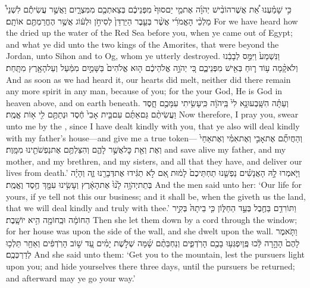 {כִּ֣י שָׁמַ֗עְנוּ אֵ֠ת אֲשֶׁר\maqqaf הוֹבִ֨ישׁ יְהֹוָ֜ה אֶת\maqqaf מֵ֤י יַם\maqqaf סוּף֙ מִפְּנֵיכֶ֔ם בְּצֵאתְכֶ֖ם מִמִּצְרָ֑יִם וַאֲשֶׁ֣ר עֲשִׂיתֶ֡ם לִשְׁנֵי֩ מַלְכֵ֨י הָאֱמֹרִ֜י אֲשֶׁ֨ר בְּעֵ֤בֶר הַיַּרְדֵּן֙ לְסִיחֹ֣ן וּלְע֔וֹג אֲשֶׁ֥ר הֶחֱרַמְתֶּ֖ם אוֹתָֽם׃}
{For we have heard how the \lord\space dried up the water of the Red Sea before you, when ye came out of Egypt; and what ye did unto the two kings of the Amorites, that were beyond the Jordan, unto Sihon and to Og, whom ye utterly destroyed.}
{וַנִּשְׁמַע֙ וַיִּמַּ֣ס לְבָבֵ֔נוּ וְלֹא\maqqaf קָ֨מָה ע֥וֹד ר֛וּחַ בְּאִ֖ישׁ מִפְּנֵיכֶ֑ם כִּ֚י יְהֹוָ֣ה אֱלֹהֵיכֶ֔ם ה֤וּא אֱלֹהִים֙ בַּשָּׁמַ֣יִם מִמַּ֔עַל וְעַל\maqqaf הָאָ֖רֶץ מִתָּֽחַת׃}
{And as soon as we had heard it, our hearts did melt, neither did there remain any more spirit in any man, because of you; for the \lord\space your God, He is God in heaven above, and on earth beneath.}
{וְעַתָּ֗ה הִשָּֽׁבְעוּ\maqqaf נָ֥א לִי֙ בַּֽיהֹוָ֔ה כִּֽי\maqqaf עָשִׂ֥יתִי עִמָּכֶ֖ם חָ֑סֶד וַעֲשִׂיתֶ֨ם גַּם\maqqaf אַתֶּ֜ם עִם\maqqaf בֵּ֤ית אָבִי֙ חֶ֔סֶד וּנְתַתֶּ֥ם לִ֖י א֥וֹת אֱמֶֽת׃}
{Now therefore, I pray you, swear unto me by the \lord, since I have dealt kindly with you, that ye also will deal kindly with my father’s house—and give me a true token—}
{וְהַחֲיִתֶ֞ם אֶת\maqqaf אָבִ֣י וְאֶת\maqqaf אִמִּ֗י וְאֶת\maqqaf אַחַי֙ וְאֶת\maqqaf {} וְאֵ֖ת כׇּל\maqqaf אֲשֶׁ֣ר לָהֶ֑ם וְהִצַּלְתֶּ֥ם אֶת\maqqaf נַפְשֹׁתֵ֖ינוּ מִמָּֽוֶת׃}
{and save alive my father, and my mother, and my brethren, and my sisters, and all that they have, and deliver our lives from death.’}
{וַיֹּ֧אמְרוּ לָ֣הּ הָאֲנָשִׁ֗ים נַפְשֵׁ֤נוּ תַחְתֵּיכֶם֙ לָמ֔וּת אִ֚ם לֹ֣א תַגִּ֔ידוּ אֶת\maqqaf דְּבָרֵ֖נוּ זֶ֑ה וְהָיָ֗ה בְּתֵת\maqqaf יְהֹוָ֥ה לָ֙נוּ֙ אֶת\maqqaf הָאָ֔רֶץ וְעָשִׂ֥ינוּ עִמָּ֖ךְ חֶ֥סֶד וֶאֱמֶֽת׃}
{And the men said unto her: ‘Our life for yours, if ye tell not this our business; and it shall be, when the \lord\space giveth us the land, that we will deal kindly and truly with thee.’}
{וַתּוֹרִדֵ֥ם בַּחֶ֖בֶל בְּעַ֣ד הַחַלּ֑וֹן כִּ֤י בֵיתָהּ֙ בְּקִ֣יר הַחוֹמָ֔ה וּבַֽחוֹמָ֖ה הִ֥יא יוֹשָֽׁבֶת׃}
{Then she let them down by a cord through the window; for her house was upon the side of the wall, and she dwelt upon the wall.}
{וַתֹּ֤אמֶר לָהֶם֙ הָהָ֣רָה לֵּ֔כוּ פֶּֽן\maqqaf יִפְגְּע֥וּ בָכֶ֖ם הָרֹֽדְפִ֑ים וְנַחְבֵּתֶ֨ם שָׁ֜מָּה שְׁלֹ֣שֶׁת יָמִ֗ים עַ֚ד שׁ֣וֹב הָרֹֽדְפִ֔ים וְאַחַ֖ר תֵּלְכ֥וּ לְדַרְכְּכֶֽם׃}
{And she said unto them: ‘Get you to the mountain, lest the pursuers light upon you; and hide yourselves there three days, until the pursuers be returned; and afterward may ye go your way.’}
